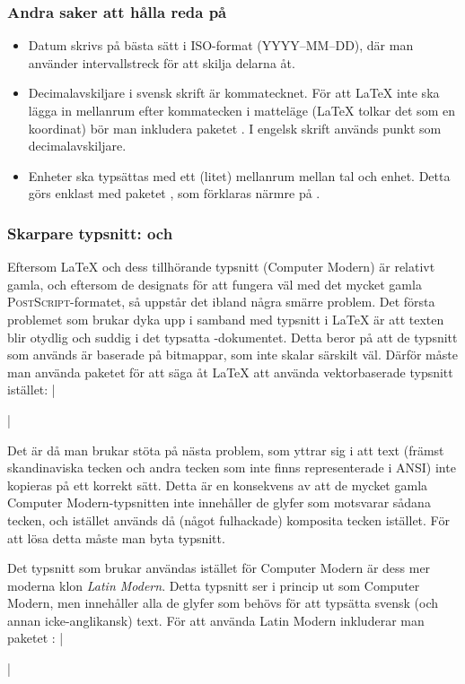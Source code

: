 \documentclass[lang=sv,ptsize=10pt,font=none,nomath,titles=bf,../../a4.tex]{subfiles}
\begin{document}
\subsubsection{Andra saker att hålla reda på}
\begin{itemize}
 \item Datum skrivs på bästa sätt i ISO-format (YYYY–MM–DD), där man
använder intervallstreck för att skilja delarna åt.
	
\item Decimalavskiljare i svensk skrift är kommatecknet. För att
	\LaTeX{} inte ska lägga in mellanrum efter kommatecken i matteläge
	(\LaTeX{} tolkar det som en koordinat) bör man inkludera paketet
	. I engelsk skrift används punkt som decimalavskiljare.
	
\item Enheter ska typsättas med ett (litet) mellanrum mellan tal och
	enhet. Detta görs enklast med paketet , som förklaras
	närmre på  .
\end{itemize}

\subsubsection{Skarpare typsnitt:  och }
\label{sec:2:lmodern}
Eftersom \LaTeX{} och dess tillhörande typsnitt (Computer Modern) är
relativt gamla, och eftersom de designats för att fungera väl med det
mycket gamla \textsc{PostScript}-formatet, så uppstår det ibland några
smärre problem. Det första problemet som brukar dyka upp i samband med
typsnitt i \LaTeX{} är att texten blir otydlig och suddig i det typsatta
\PDF-dokumentet. Detta beror på att de typsnitt som används är baserade
på bitmappar, som inte skalar särskilt väl. Därför måste man använda
paketet  för att säga åt \LaTeX{} att använda vektorbaserade
typsnitt istället:
\latex|\usepackage[T1]{fontenc}|

Det är då man brukar stöta på nästa problem, som yttrar sig i att text
(främst skandinaviska tecken och andra tecken som inte finns 
representerade i \textsc{ANSI}) inte kopieras på ett korrekt sätt. Detta
är en konsekvens av att de mycket gamla Computer Modern-typsnitten inte
innehåller de glyfer som motsvarar sådana tecken, och istället används då
(något fulhackade) komposita tecken istället. För att lösa detta måste man
byta typsnitt.

Det typsnitt som brukar användas istället för Computer Modern är dess
mer moderna klon \emph{Latin Modern}. Detta typsnitt ser
i princip ut som Computer Modern, men innehåller alla de glyfer som behövs
för att typsätta svensk (och annan icke-anglikansk) text. För att använda
Latin Modern inkluderar man paketet :
\latex|\usepackage{lmodern}|
\end{document}
